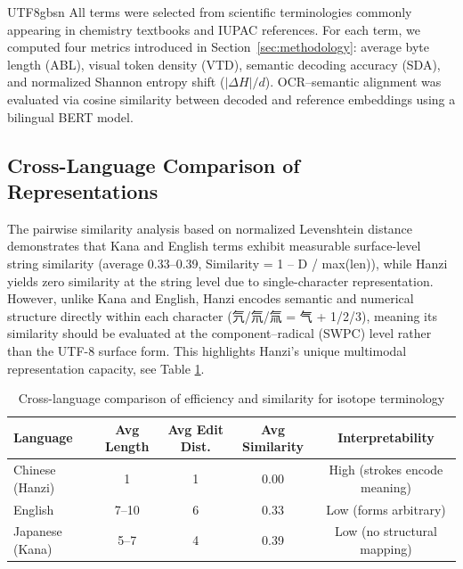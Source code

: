 \documentclass[conference]{IEEEtran}
\begin{document}
\begin{CJK*}{UTF8}{gbsn}
All terms were selected from scientific terminologies commonly appearing in chemistry textbooks and IUPAC references.  
For each term, we computed four metrics introduced in Section~\ref{sec:methodology}:  
average byte length (ABL), visual token density (VTD), semantic decoding accuracy (SDA), and normalized Shannon entropy shift ($|\Delta H|/d$).  
OCR–semantic alignment was evaluated via cosine similarity between decoded and reference embeddings using a bilingual BERT model.

\subsection{Cross-Language Comparison of Representations}
The pairwise similarity analysis based on normalized Levenshtein distance
demonstrates that Kana and English terms exhibit measurable surface-level
string similarity (average 0.33–0.39, Similarity = 1 – D / max(len)), while Hanzi yields zero similarity at the
string level due to single-character representation. However, unlike Kana and
English, Hanzi encodes semantic and numerical structure directly within each
character (氕/氘/氚 = 气 + 1/2/3), meaning its similarity should be evaluated
at the component–radical (SWPC) level rather than the UTF-8 surface form.
This highlights Hanzi's unique multimodal representation capacity, see Table \ref{tab:language_comparison}.

\begin{table}[h!]
\centering
\caption{Cross-language comparison of efficiency and similarity for isotope terminology}
\label{tab:language_comparison}
\begin{tabular}{|l|c|c|c|c|}
\hline
\textbf{Language} & \textbf{Avg Length} & \textbf{Avg Edit Dist.} & \textbf{Avg Similarity} & \textbf{Interpretability} \\
\hline
Chinese (Hanzi) & 1 & 1 & 0.00 & High (strokes encode meaning) \\
\hline
English & 7--10 & 6 & 0.33 & Low (forms arbitrary) \\
\hline
Japanese (Kana) & 5--7 & 4 & 0.39 & Low (no structural mapping) \\
\hline
\end{tabular}
\end{table}


\end{CJK*}
\end{document}
